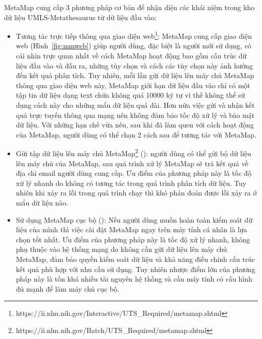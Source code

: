 MetaMap cung cấp 3 phương pháp cơ bản để nhận diện các khái niệm trong kho dữ liệu UMLS-Metathesaurus từ dữ liệu đầu vào:
\begin{itemize}
\item Tương tác trực tiếp thông qua giao diện web\footnote{https://ii.nlm.nih.gov/Interactive/UTS\_Required/metamap.shtml}: MetaMap cung cấp giao diện web (Hình~\ref{fig:mmweb}) giúp người dùng, đặc biệt là người mới sử dụng, có cái nhìn trực quan nhất về cách MetaMap hoạt động bao gồm cấu trúc dữ liệu đầu vào và đầu ra, những tùy chọn và cách các tùy chọn này ảnh hưởng đến kết quả phân tích. Tuy nhiên, mỗi lần gửi dữ liệu lên máy chủ MetaMap thông qua giao diện web này, MetaMap giới hạn dữ liệu đầu vào chỉ có một tập tin dữ liệu dạng text chứa không quá 10000 ký tự vì thế không thể sử dụng cách này cho những mẩu dữ liệu quá dài. Hơn nữa việc gửi và nhận kết quả trực tuyến thông qua mạng nên không đảm bảo tốc độ xử lý và bảo mật dữ liệu. Với những hạn chế vừa nêu, sau khi đã làm quen với cách hoạt động của MetaMap, người dùng có thể chọn 2 cách sau để tương tác với MetaMap.


\item Gửi tập dữ liệu lên máy chủ MetaMap\footnote{https://ii.nlm.nih.gov/Batch/UTS\_Required/metamap.shtml} (): người dùng có thể gửi bộ dữ liệu lên máy chủ của MetaMap, sau quá trình xử lý MetaMap sẽ trả kết quả về địa chỉ email người dùng cung cấp. Ưu điểm của phương pháp này là tốc độ xử lý nhanh do không có tương tác trong quá trình phân tích dữ liệu. Tuy nhiên khi xảy ra lỗi trong quá trình chạy thì khó phán đoán được lỗi xảy ra ở mẩu dữ liệu nào. 

\item Sử dụng MetaMap cục bộ (): Nếu người dùng muốn hoàn toàn kiểm soát dữ liệu của mình thì việc cài đặt MetaMap ngay trên máy tính cá nhân là lựa chọn tốt nhất. Ưu điểm của phương pháp này là tốc độ xử lý nhanh, không phụ thuộc vào hệ thống mạng do không cần gửi dữ liệu lên máy chủ MetaMap, đảm bảo quyền kiểm soát dữ liệu và khả năng điều chỉnh cấu trúc kết quả phù hợp với nhu cầu sử dụng. Tuy nhiên nhược điểm lớn của phương pháp này là tốn khá nhiều tài nguyên hệ thống và cần máy tính có cấu hình đủ mạnh để làm máy chủ cục bộ.
\end{itemize}

